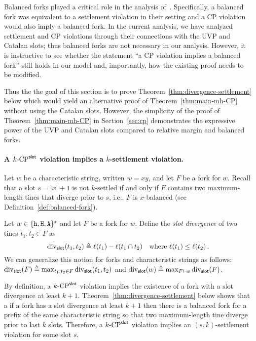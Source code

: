 Balanced forks played a critical role 
in the analysis of~\cite{LinearConsistency}. 
Specifically, a balanced fork was equivalent to a settlement violation in their setting 
and a CP violation would also imply a balanced fork.
In the current analysis, 
we have analyzed settlement and CP violations through 
their connections with the UVP and Catalan slots; 
thus balanced forks are not necessary in our analysis. 
However, it is instructive to see 
whether the statement ``a CP violation implies a balanced fork'' 
still holds in our model 
and, importantly, 
how the existing proof needs to be modified. 

Thus the the goal of this section is to prove 
Theorem~\ref{thm:divergence-settlement} below which 
would yield an alternative proof of Theorem~\ref{thm:main-mh-CP} 
without using the Catalan slots.
However, the simplicity of the proof of Theorem~\ref{thm:main-mh-CP} 
in Section~\ref{sec:cp} 
demonstrates the expressive power of the UVP and Catalan slots 
compared to relative margin and balanced forks.



\paragraph{A ${k}\text{-}\mathrm{CP}^{\mathsf{slot}}$ violation implies a $k$-settlement violation.}
Let $w$ be a characteristic string, written $w = xy$, 
and let $F$ be a fork for $w$. 
Recall that a slot $s = |x| + 1$ is not $k$-settled 
if and only if $F$ contains 
two maximum-length tines that diverge prior to $s$, 
i.e., $F$ is $x$-balanced (see Definition~\ref{def:balanced-fork}).


\begin{definition}\label{def:slot-divergence}
  Let $w \in \{\mathtt{h}, \mathtt{H}, \mathtt{A}\}^*$ and let $F$ be a fork for $w$. 
  Define the \emph{slot divergence} of 
  two tines $t_1, t_2 \in F$ 
  as 
  \begin{equation}\label{eq:slot-divergence-tines}
    \mathrm{div}_{\mathsf{slot}}(t_1, t_2) \triangleq \ell(t_1) - \ell(t_1 \cap t_2)
    \quad\text{where $\ell(t_1) \leq \ell(t_2)$}
    \,.
  \end{equation}
  We can generalize this notion for forks and characteristic strings as follows: 
  $\mathrm{div}_{\mathsf{slot}}(F) \triangleq \max_{t_1, t_2 \in F} \mathrm{div}_{\mathsf{slot}}(t_1, t_2)$ and 
  $\mathrm{div}_{\mathsf{slot}}(w) \triangleq \max_{F \vdash w} \mathrm{div}_{\mathsf{slot}}(F)$. 
\end{definition}

By definition, a ${k}\text{-}\mathrm{CP}^{\mathsf{slot}}$ violation 
implies the existence of a fork with a slot divergence at least $k + 1$. 
Theorem~\ref{thm:divergence-settlement} below 
shows that a if a fork has a slot divergence at least $k+1$ then 
there is a balanced fork for a prefix of the same characteristic string so that 
two maximum-length tine diverge prior to last $k$ slots. 
Therefore, a ${k}\text{-}\mathrm{CP}^{\mathsf{slot}}$ violation implies an $(s,k)$-settlement violation 
for some slot $s$.



